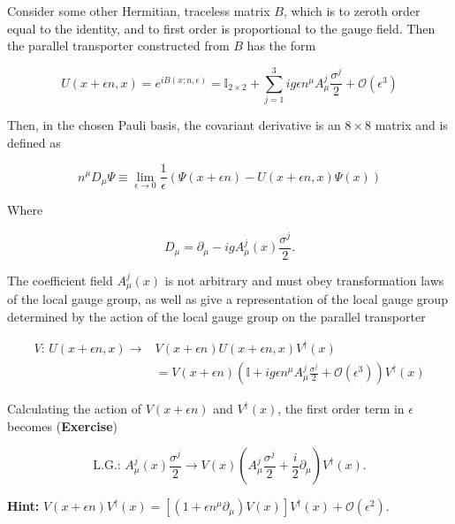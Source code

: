 \noindent Consider some other Hermitian, traceless matrix $B$, which is to zeroth order equal to the identity, and to first order is proportional to the gauge field. Then the parallel transporter constructed from $B$ has the form

\begin{equation}
U(x + \epsilon n , x) = e^{i B(x;n,\epsilon)} = \mathbb{I}_{2\times 2} + \sum_{j=1}^3 i g \epsilon n^\mu A_\mu^j \frac{\sigma^j}{2} + \mathcal{O}(\epsilon^3)
\end{equation}

\noindent Then, in the chosen Pauli basis, the covariant derivative is an $8 \times 8$ matrix and is defined as

\begin{equation}
n^\mu D_\mu \Psi \equiv \lim_{\epsilon \rightarrow 0} \frac{1}{\epsilon} ( \Psi (x + \epsilon n) - U(x + \epsilon n, x) \Psi (x) )
\end{equation}

\noindent Where

\begin{equation}
D_\mu = \partial_\mu - i g A_\mu^j (x) \frac{\sigma^j}{2}.
\end{equation}

\noindent The coefficient field $A_\mu^j (x)$ is not arbitrary and must obey transformation laws of the local gauge group, as well as give a representation of the local gauge group determined by the action of the local gauge group on the parallel transporter

\begin{align}
V: \, U(x + \epsilon n, x) \rightarrow& V(x + \epsilon n) U(x + \epsilon n, x) V^\dagger (x) \\
&= V(x + \epsilon n) \left( \mathbb{I} + i g \epsilon n^\mu A_\mu^j \frac{\sigma^j}{2} + \mathcal{O} (\epsilon^3) \right) V^\dagger (x)
\end{align}

\noindent Calculating the action of  $V(x + \epsilon n)$ and $V^\dagger (x)$, the first order term in $\epsilon$ becomes (\textbf{Exercise})

\begin{equation}
\text{L.G.}: \, A_\mu^j (x) \frac{\sigma^j}{2} \rightarrow V(x) \left( A_\mu^j \frac{\sigma^j}{2} + \frac{i}{2} \partial_\mu \right) V^\dagger (x) .
\end{equation}

\textbf{Hint:} $V(x+\epsilon n) V^\dagger (x) = \left[ (1+\epsilon n^\mu \partial_\mu)V(x) \right] V^\dagger (x) + \mathcal{O}(\epsilon^2)$. \\

